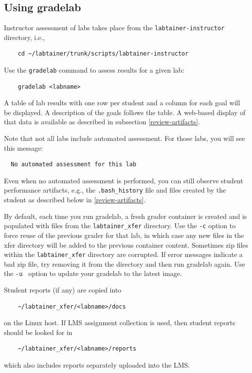 \documentclass[12pt]{article}
\begin{document}
\subsection{Using gradelab}
Instructor assessment of labs takes place from the {\tt labtainer-instructor} directory, i.e.,
\begin{verbatim}
    cd ~/labtainer/trunk/scripts/labtainer-instructor
\end{verbatim}

\noindent Use the {\tt gradelab} command to assess results for a given lab:
\begin{verbatim}
    gradelab <labname>
\end{verbatim}
\noindent A table of lab results with one row per student and
a column for each goal will be displayed.  A description of the goals follows the table.
A web-based display of that data is available as described in subsection \ref{review-artifacts}.

Note that not all labs include automated assessment.  For those labs, you will see this
message:
\begin{verbatim}
  No automated assessment for this lab
\end{verbatim}
\noindent Even when no automated assessment is performed, you can still observe student performance
artifacts, e.g., the {\tt .bash\_history} file and files created by the student as described below in \ref{review-artifacts}.

By default, each time you run gradelab, a fresh grader container is created and is populated with files from the 
{\tt labtainer\_xfer} directory.   Use the {\tt -c} option to force reuse of the previous grader for that lab, in which case
any new files in the xfer directory will be added to the previous container content.
Sometimes zip files within the {\tt labtainer\_xfer} directory are corrupted.  If error messages indicate a bad zip file,
try removing it from the directory and then run gradelab again.
Use the {\tt -u } option to update your gradelab to the latest image.

Student reports (if any) are  copied into 
\begin{verbatim}
    ~/labtainer_xfer/<labname>/docs
\end{verbatim}
\noindent on the Linux host.  If LMS assignment collection is used, then student reports should
be looked for in 
\begin{verbatim}
    ~/labtainer_xfer/<labname>/reports
\end{verbatim}
\noindent which also includes reports separately uploaded into the LMS.
\end{document}
